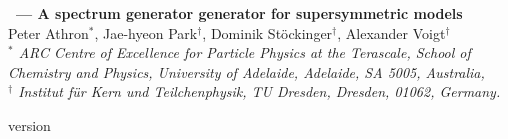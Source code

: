 \documentclass[a4paper,11pt]{article}
\begin{document}
\begin{titlepage}
  \vspace*{55mm}
  \begin{center}
    {\Large\bf \FlexibleSUSY\ --- A spectrum generator generator for
      supersymmetric models}
    \\[8mm]
    Peter Athron$^{*}$,
    Jae-hyeon Park$^{\dagger}$,
    Dominik St\"ockinger$^{\dagger}$,
    Alexander Voigt$^{\dagger}$
    \\[3mm]
    {\small\it $^*$ ARC Centre of Excellence for Particle Physics at
      the Terascale, School of Chemistry and Physics, University of
      Adelaide, Adelaide, SA 5005, Australia,
      \\[2mm]
      \small\it $^\dagger$ Institut f\"ur Kern und Teilchenphysik, TU
      Dresden, Dresden, 01062, Germany.\\[2mm]}
  \end{center}
  \vspace*{0.75cm}
  \begin{abstract}
    We present FlexibleSUSY a new spectrum generator generator for
    supersymmetric models with modularity and speed in mind.
  \end{abstract}
  \vfill
  \begin{flushleft}
    \FlexibleSUSY version \FlexibleSUSYVersion
  \end{flushleft}
\end{titlepage}

\tableofcontents
\clearpage






\clearpage
\pagestyle{plain}



\end{document}

